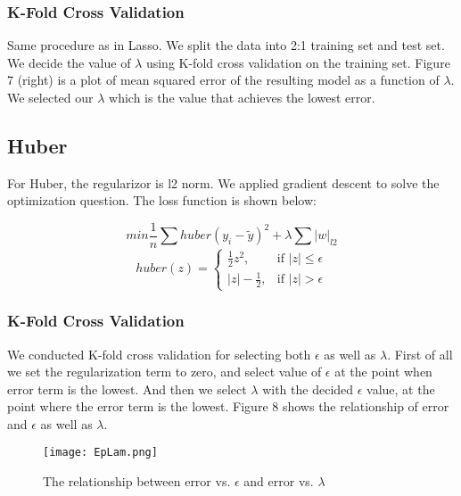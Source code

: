 \documentclass[a4paper]{article}
\begin{document}
\subsubsection{K-Fold Cross Validation}
Same procedure as in Lasso. We split the data into 2:1 training set and test set. We decide the value of $\lambda$ using K-fold cross validation on the training set. Figure 7 (right) is a plot of mean squared error of the resulting model as a function of $\lambda$. We selected our $\lambda$ which is the value that achieves the lowest error.

\subsection{Huber}
For Huber, the regularizor is l2 norm. We applied gradient descent to solve the optimization question. The loss function is shown below:

\begin{equation}
min \frac{1}{n} \sum huber(y_i - \widetilde{y})^2 + \lambda \sum |w|_{l2}
\end{equation}
\begin{equation}
huber(z) = \begin{cases} \frac{1}{2}z^2, & \mbox{if } |z| \leq \epsilon \\ |z|-\frac{1}{2}, & \mbox{if } |z| > \epsilon \end{cases}
\end{equation}

\subsubsection{K-Fold Cross Validation}
We conducted K-fold cross validation for selecting both $\epsilon$ as well as $\lambda$. First of all we set the regularization term to zero, and select value of $\epsilon$ at the point when error term is the lowest. And then we select $\lambda$ with the decided $\epsilon$ value, at the point where the error term is the lowest. Figure 8 shows the relationship of error and $\epsilon$ as well as $\lambda$.

\begin{figure}[h]
\centering
\texttt{[image: EpLam.png]}
\caption{\label{fig:scatter plot}The relationship between error vs. $\epsilon$ and error vs. $\lambda$}
\end{figure}
\end{document}
